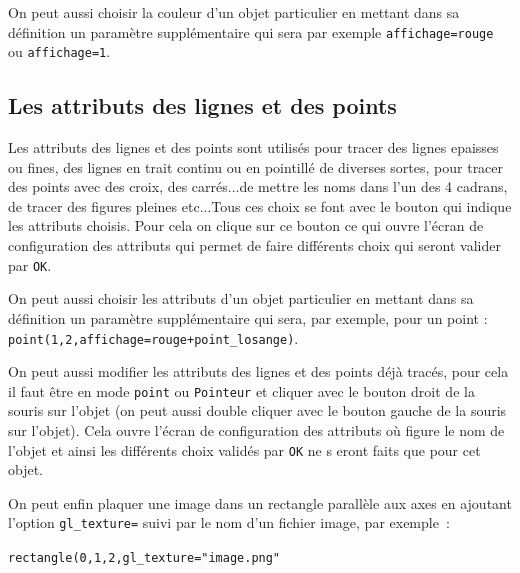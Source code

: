 \documentclass[a4paper,11pt]{article}
\begin{document}
On peut aussi choisir la couleur d'un objet particulier en mettant dans sa 
d\'efinition un param\`etre suppl\'ementaire qui sera par exemple 
{\tt affichage=rouge} ou {\tt affichage=1}.

\subsection{Les attributs des lignes et des points}
 \label{sec:attributs2d}
Les attributs des lignes et des points sont utilis\'es pour  tracer des lignes 
epaisses ou fines, des lignes en trait continu ou 
en pointill\'e de diverses sortes, pour tracer des points avec des croix, des 
carr\'es...de mettre les noms dans l'un des 4 cadrans, de tracer des figures 
pleines etc...Tous ces choix se font avec le bouton qui indique les attributs 
choisis. Pour cela on clique sur ce bouton ce qui ouvre l'\'ecran de 
configuration des attributs qui permet de faire diff\'erents choix qui
seront valider par {\tt OK}.

On peut aussi choisir les attributs d'un objet particulier 
en mettant dans sa d\'efinition un param\`etre suppl\'ementaire qui sera, 
par exemple, pour un point :\\
{\tt point(1,2,affichage=rouge+point\_losange)}.

On peut aussi modifier les attributs des lignes et des points d\'ej\`a 
trac\'es, pour cela il faut \^etre en mode {\tt point} ou {\tt Pointeur} et 
cliquer avec le bouton droit de la souris sur l'objet (on peut aussi double 
cliquer avec le bouton gauche de la souris sur l'objet). 
Cela ouvre l'\'ecran de configuration des attributs o\`u figure
le nom de l'objet et ainsi les diff\'erents choix valid\'es par {\tt OK} ne s
eront faits que pour cet objet.

On peut enfin plaquer une image dans un rectangle parall\`ele aux axes
en ajoutant l'option
\verb|gl_texture=| suivi par le nom d'un fichier image, par exemple~:
\begin{center}
\verb|rectangle(0,1,2,gl_texture="image.png"|
\end{center} 
\end{document}
